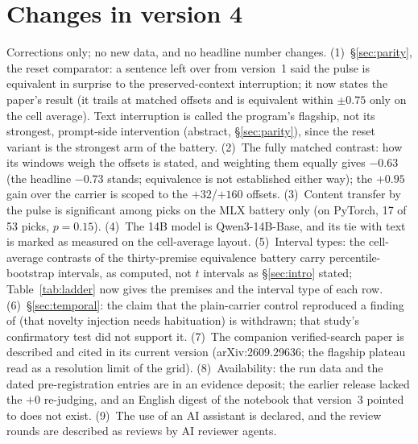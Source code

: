 \documentclass[11pt]{article}
\begin{document}
\section*{Changes in version 4}
Corrections only; no new data, and no headline number changes.
(1)~\S\ref{sec:parity}, the reset comparator: a sentence left over from
version~1 said the pulse is equivalent in surprise to the
preserved-context interruption; it now states the paper's result (it
trails at matched offsets and is equivalent within $\pm0.75$ only on
the cell average). Text interruption is called the program's flagship,
not its strongest, prompt-side intervention (abstract,
\S\ref{sec:parity}), since the reset variant is the strongest arm of
the battery.
(2)~The fully matched contrast: how its windows weigh the offsets is
stated, and weighting them equally gives $-0.63$ (the headline $-0.73$
stands; equivalence is not established either way); the $+0.95$ gain
over the carrier is scoped to the $+32$/$+160$ offsets.
(3)~Content transfer by the pulse is significant among picks on the MLX
battery only (on PyTorch, 17 of 53 picks, $p=0.15$).
(4)~The 14B model is Qwen3-14B-Base, and its tie with text is marked as
measured on the cell-average layout.
(5)~Interval types: the cell-average contrasts of the thirty-premise
equivalence battery carry percentile-bootstrap intervals, as computed,
not $t$ intervals as \S\ref{sec:intro} stated; Table~\ref{tab:ladder}
now gives the premises and the interval type of each row.
(6)~\S\ref{sec:temporal}: the claim that the plain-carrier control
reproduced a finding of \citet{ono2026interrupting} (that novelty
injection needs habituation) is withdrawn; that study's confirmatory
test did not support it.
(7)~The companion verified-search paper is described and cited in its
current version (arXiv:2609.29636; the flagship plateau read as a
resolution limit of the grid).
(8)~Availability: the run data and the dated pre-registration entries
are in an evidence deposit; the earlier release lacked the $+0$
re-judging, and an English digest of the notebook that version~3
pointed to does not exist.
(9)~The use of an AI assistant is declared, and the review rounds are
described as reviews by AI reviewer agents.



\end{document}
